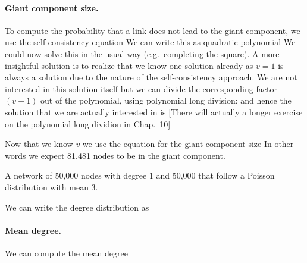 \paragraph{Giant component size.}To compute the probability that a link does not lead to the giant component, we use the self-consistency equation
We can write this as quadratic polynomial
We could now solve this in the usual way (e.g.~completing the square). A more insightful solution is to realize that we know one solution already as $v=1$ is always a solution due to the nature of the self-consistency approach. We are not interested in this solution itself but we can divide the corresponding factor $(v-1)$ out of the polynomial, using polynomial long division:
and hence the solution that we are actually interested in is 
[There will actually a longer exercise on the polynomial long dividion in Chap.~10]

Now that we know $v$ we use the equation for the giant component size 
In other words we expect 81.481 nodes to be in the giant component. 

\subquestion A network of 50,000 nodes with degree 1 and 50,000 that follow a Poisson distribution with mean 3.

\solution
We can write the degree distribution as 
\paragraph{Mean degree.}We can compute the mean degree 
